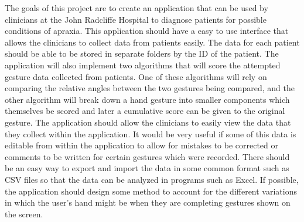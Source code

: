 The goals of this project are to create an application that can be used by clinicians at the John Radcliffe Hospital to diagnose patients for possible conditions of apraxia. This application should have a easy to use interface that allows the clinicians to collect data from patients easily. The data for each patient should be able to be stored in separate folders by the ID of the patient. The application will also implement two algorithms that will score the attempted gesture data collected from patients. One of these algorithms will rely on comparing the relative angles between the two gestures being compared, and the other algorithm will break down a hand gesture into smaller components which themselves be scored and later a cumulative score can be given to the original gesture. The application should allow the clinicians to easily view the data that they collect within the application. It would be very useful if some of this data is editable from within the application to allow for mistakes to be corrected or comments to be written for certain gestures which were recorded. There should be an easy way to export and import the data in some common format such as CSV files so that the data can be analyzed in programs such as Excel. If possible, the application should design some method to account for the different variations in which the user's hand might be when they are completing gestures shown on the screen. 

